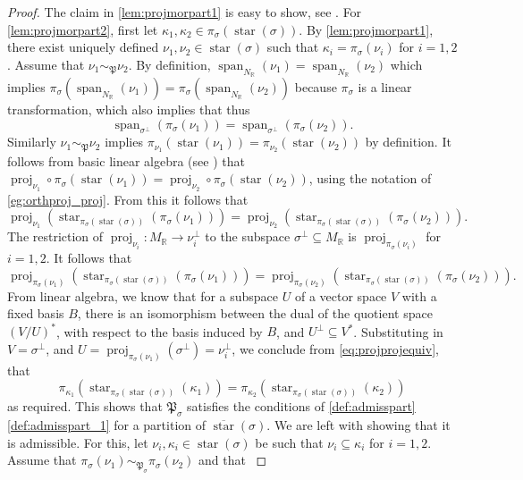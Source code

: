 \documentclass[10pt,twoside, a4paper,reqno]{amsart}
\DeclareMathOperator{\proj}{proj}
\DeclareMathOperator{\spann}{span}
\DeclareMathOperator{\starr}{star}
\newcommand{\Pfrak}{\mathfrak{P}}
\newcommand{\R}{\mathbb{R}}
\theoremstyle{definition}
\begin{document}
\begin{proof}
    The claim in \eqref{lem:projmorpart1} {is easy to show, see \cite[p. 52]{Ful93}}.
    For \eqref{lem:projmorpart2}, {first} l{et $\kappa_1, \kappa_2 \in \pi_{\sigma}({\starr}(\sigma))$. By \eqref{lem:projmorpart1}, there exist uniquely defined $\nu_1, \nu_2 \in \starr(\sigma)$ such that $\kappa_i = \pi_{\sigma}(\nu_i)$ for $i=1,2$. Assume that $\nu_1 \sim_{\Pfrak} \nu_2$. By definition, $\spann_{N_\R}(\nu_1) = \spann_{N_\R}(\nu_2)$ which implies $\pi_{\sigma}(\spann_{N_\R}(\nu_1)) = \pi_{\sigma}(\spann_{N_\R}(\nu_2))$ because $\pi_{\sigma}$ is a linear transformation, which also implies that thus }
    \[ \spann_{\sigma^\perp}(\pi_{\sigma}(\nu_1))= \spann_{\sigma^\perp}(\pi_{\sigma}(\nu_2)). \]
    {Similarly $\nu_1 \sim_{\Pfrak} \nu_2$ implies $\pi_{\nu_1}(\starr(\nu_1)) = \pi_{\nu_2}(\starr(\nu_2))$ {by definition}. It follows from basic linear algebra (see \cite[Lem. 3.2]{Kai23}) that $\proj_{\nu_1} \circ \pi_{\sigma}(\starr(\nu_1)) = \proj_{\nu_2} \circ \pi_{\sigma}(\starr(\nu_2))$, using the notation of \eqref{eg:orthproj_proj}. From this it follows that }
    \[ \proj_{\nu_1} ( \starr_{\pi_{\sigma}(\starr(\sigma))}( \pi_{\sigma}(\nu_1))) = \proj_{\nu_2} ( \starr_{\pi_{\sigma}(\starr(\sigma))}( \pi_{\sigma}(\nu_2))). \]
    The restriction of $\proj_{\nu_i}: M_\R \to \nu_i^\perp$ to the subspace $\sigma^\perp \subseteq M_\R$ is $\proj_{\pi_{\sigma}(\nu_i)}$ for $i=1,2$. It follows that 
    \begin{equation}\label{eq:projprojequiv} \proj_{\pi_{\sigma}(\nu_1)} ( \starr_{\pi_{\sigma}(\starr(\sigma))}(\pi_{\sigma}(\nu_1))) = \proj_{\pi_{\sigma}(\nu_2)} ( \starr_{\pi_{\sigma}(\starr(\sigma))}(\pi_{\sigma}(\nu_2))). \end{equation}
    From linear algebra, we know that for a subspace $U$ of a vector space $V$ with a fixed basis $B$, there is an isomorphism between the dual of the quotient space $(V/U)^*$, with respect to the basis induced by $B$, and $U^\perp \subseteq V^*$. Substituting in $V = \sigma^\perp$, and $U = \proj_{\pi_{\sigma}(\nu_1)}(\sigma^\perp) = \nu_i^\perp$, we conclude from \cref{eq:projprojequiv}, that 
    \[ \pi_{\kappa_1}(\starr_{\pi_{\sigma}(\starr(\sigma))}(\kappa_1)) = \pi_{\kappa_2}(\starr_{\pi_{\sigma}(\starr(\sigma))}(\kappa_2))\]
   as required.  {This shows that $\Pfrak_{\sigma}$ satisfies the conditions of \cref{def:admisspart}\eqref{def:admisspart_1} for a partition of $\overline{\starr}(\sigma)$. We are left with showing that it is admissible. For this, let $\nu_i, \kappa_i \in \starr(\sigma)$ be such that $\nu_i \subseteq \kappa_i$ for $i=1,2$. Assume that $\pi_{\sigma}(\nu_1) \sim_{\Pfrak_{\sigma}} \pi_{\sigma}(\nu_2)$ and that
}
\end{proof}
\end{document}
